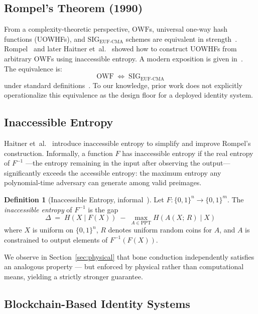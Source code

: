 \documentclass[11pt,a4paper]{article}
\theoremstyle{definition}
\newtheorem{definition}[theorem]{Definition}
\newcommand{\OWF}{\mathrm{OWF}}
\newcommand{\SIG}{\mathrm{SIG}}
\newcommand{\EUFCMA}{\mathrm{EUF\text{-}CMA}}
\begin{document}
\subsection{Rompel's Theorem (1990)}

From a complexity-theoretic perspective, $\OWF$s, universal one-way
hash functions (UOWHFs), and $\SIG_{\EUFCMA}$ schemes are equivalent
in strength~\cite{NaorYung89}. Rompel~\cite{Rompel90} and later
Haitner et~al.~\cite{Haitner10} showed how to construct UOWHFs from
arbitrary $\OWF$s using inaccessible entropy. A modern exposition is
given in~\cite{KatzKoo05}. The equivalence is:
\[
  \OWF \;\Leftrightarrow\; \SIG_{\EUFCMA}
\]
under standard definitions~\cite{Rompel90,Goldreich01}. To our
knowledge, prior work does not explicitly operationalize this
equivalence as the design floor for a deployed identity system.

\subsection{Inaccessible Entropy}
\label{sec:inaccessible}

Haitner et~al.~\cite{Haitner10} introduce inaccessible entropy to
simplify and improve Rompel's construction. Informally, a function $F$
has inaccessible entropy if the real entropy of $F^{-1}$ ---the
entropy remaining in the input after observing the output---
significantly exceeds the accessible entropy: the maximum entropy any
polynomial-time adversary can generate among valid preimages.

\begin{definition}[Inaccessible Entropy, informal~{\cite{Haitner10}}]
\label{def:inaccessible}
Let $F: \{0,1\}^n \to \{0,1\}^m$. The \emph{inaccessible entropy}
of $F^{-1}$ is the gap
\[
  \Delta \;=\; H(X \mid F(X)) \;-\; \max_{A \in \mathrm{PPT}}
  H(A(X;\,R) \mid X)
\]
where $X$ is uniform on $\{0,1\}^n$, $R$ denotes uniform random
coins for $A$, and $A$ is constrained to output elements of
$F^{-1}(F(X))$.
\end{definition}

We observe in Section~\ref{sec:physical} that bone conduction
independently satisfies an analogous property --- but enforced by
physical rather than computational means, yielding a strictly stronger
guarantee.

\subsection{Blockchain-Based Identity Systems}
\end{document}

